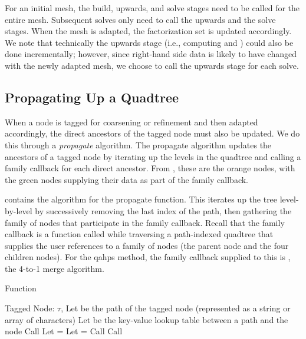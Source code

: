 For an initial mesh, the build, upwards, and solve stages need to be called for the entire mesh. Subsequent solves only need to call the upwards and the solve stages. When the mesh is adapted, the factorization set is updated accordingly. We note that technically the upwards stage (i.e., computing \htau and \wtau) could also be done incrementally; however, since right-hand side data is likely to have changed with the newly adapted mesh, we choose to call the upwards stage for each solve.

\subsection{Propagating Up a Quadtree}

When a node is tagged for coarsening or refinement and then adapted accordingly, the direct ancestors of the tagged node must also be updated. We do this through a {\em propagate} algorithm. The propagate algorithm updates the ancestors of a tagged node by iterating up the levels in the quadtree and calling a family callback for each direct ancestor. From , these are the orange nodes, with the green nodes supplying their data as part of the family callback.

 contains the algorithm for the propagate function. This iterates up the tree level-by-level by successively removing the last index of the path, then gathering the family of nodes that participate in the family callback. Recall that the family callback is a function called while traversing a path-indexed quadtree that supplies the user references to a family of nodes (the parent node and the four children nodes). For the \gls{qahps} method, the family callback supplied to this is , the 4-to-1 merge algorithm.

\begin{algorithm}
    \caption{ Function}
    \begin{algorithmic}[0]
        \Require Tagged Node: $\tau$, 
        \State Let  be the path of the tagged node (represented as a string or array of characters)
        \State Let  be the key-value lookup table between a path and the node
        \State Call  
            \State Let  = 
            \State Let  = 
            \State Call 
            \State Call 
        \EndWhile
    \end{algorithmic}
    \label{alg:propagate}
\end{algorithm}


